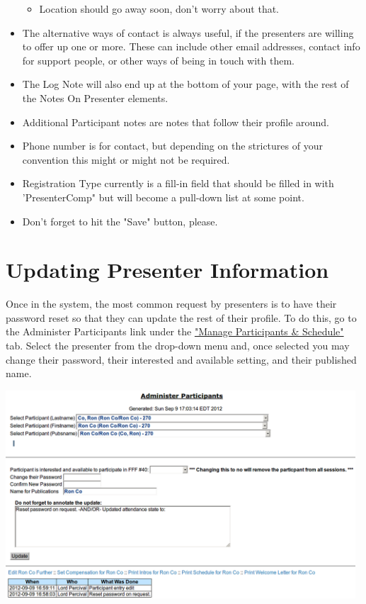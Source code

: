 \documentclass[captions=tablesignature]{scrartcl}
\begin{document}
\begin{itemize}
\begin{itemize}
\item Location should go away soon, don't worry about that.
\end{itemize}

\item The alternative ways of contact is always useful, if the
presenters are willing to offer up one or more.  These can
include other email addresses, contact info for support people,
or other ways of being in touch with them.

\item The Log Note will also end up at the bottom of your page, with
the rest of the Notes On Presenter elements.

\item Additional Participant notes are notes that follow their profile
around.

\item Phone number is for contact, but depending on the strictures of
your convention this might or might not be required.

\item Registration Type currently is a fill-in field that should be
filled in with 'PresenterComp" but will become a pull-down list
at some point.

\item Don't forget to hit the "Save" button, please.
\end{itemize}
\section{Updating Presenter Information}
\label{sec-3}
Once in the system, the most common request by presenters is to have
their password reset so that they can update the rest of their
profile.  To do this, go to the Administer Participants link under
the \hyperref[sec-2]{"Manage Participants \& Schedule"} tab.  Select the presenter from
the drop-down menu and, once selected you may change their password,
their interested and available setting, and their published name.

\includegraphics[width=0.98\textwidth]{./Images/Administer_Participants.png}
\end{document}

